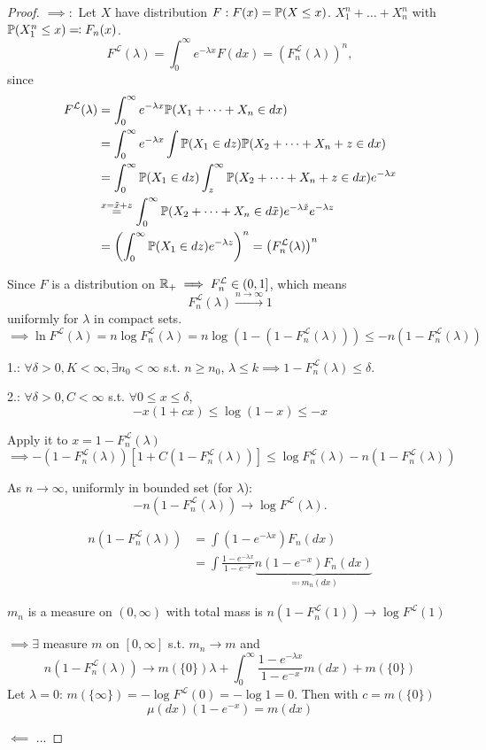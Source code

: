\begin{proof}
    $\implies:$ Let $X$ have distribution $F:F(x)=\mathbb{P}(X\leq x)$. $X_1^n+\dots+X_n^n$ with $\mathbb{P}(X_1^n\leq x)\eqqcolon F_n(x)$.   
    \[F^{\mathcal{L}}(\lambda)=\int_0^\infty e^{-\lambda x}F(dx)=(F_n^{\mathcal{L}}(\lambda))^n,\]
    since 
    \begin{align*}
        F^{\mathcal{L}}(\lambda)&=\int_0^\infty e^{-\lambda x}\mathbb{P}(X_1+\dots+X_n\in dx)\\
        &=\int_0^\infty e^{-\lambda x}\int \mathbb{P}(X_1\in dz)\mathbb{P}(X_2+\dots+X_n+z\in dx)\\
        &=\int_0^\infty \mathbb{P}(X_1\in dz)\int_z^\infty \mathbb{P}(X_2+\dots+X_n+z\in dx)e^{-\lambda x}\\
        &\stackrel{x=\tilde{x}+z}{=}\int_0^\infty \mathbb{P}(X_2+\dots+X_n\in d\tilde{x})e^{-\lambda \tilde{x}}e^{-\lambda z}\\
        &=\left(\int_0^\infty \mathbb{P}(X_1\in dz)e^{-\lambda z}\right)^n = \left(F_n^{\mathcal{L}}(\lambda)\right)^n
    \end{align*}

    Since $F$ is a distribution on $\mathbb{R}_+\implies F_n^{\mathcal{L}}\in (0,1]$, which means 
    \[F_n^{\mathcal{L}}(\lambda)\stackrel{n\to\infty}{\to}1\]
    uniformly for $\lambda$ in compact sets. 
    \[\implies \ln F^{\mathcal{L}}(\lambda)=n\log F_n^{\mathcal{L}}(\lambda)=n\log (1-(1-F_n^{\mathcal{L}}(\lambda)))\leq -n (1-F_n^{\mathcal{L}}(\lambda))\]

    1.: $\forall \delta>0,K<\infty,\exists n_0<\infty$ s.t. $n\geq n_0$, $\lambda \leq k\implies 1-F_n^{\mathcal{L}}(\lambda)\leq \delta$.

    2.: $\forall \delta>0, C<\infty$ s.t. $\forall 0\leq x\leq \delta$,
    \[-x(1+cx)\leq \log(1-x)\leq -x\]

    Apply it to $x=1-F_n^{\mathcal{L}}(\lambda)$
    \[\implies -(1-F_n^{\mathcal{L}}(\lambda))[1+C(1-F_n^{\mathcal{L}}(\lambda))]\leq \log F_n^{\mathcal{L}}(\lambda)-n(1-F_n^{\mathcal{L}}(\lambda))\]

    As $n\to\infty$, uniformly in bounded set (for $\lambda$):
    \[-n(1-F_n^{\mathcal{L}}(\lambda))\to\log F^{\mathcal{L}}(\lambda).\]

    \begin{align*}
        n(1-F_n^{\mathcal{L}}(\lambda))&=\int(1-e^{-\lambda x}) F_n(dx)\\
        &= \int\frac{1-e^{-\lambda x}}{1-e^{-x}} \underbrace{n(1-e^{-x}) F_n(dx)}_{\eqcolon m_n(dx)}
    \end{align*}

    $m_n$ is a measure on $(0,\infty)$ with total mass is $n(1-F_n^{\mathcal{L}}(1))\to\log F^{\mathcal{L}}(1)$

    $\implies\exists$ measure $m$ on $[0,\infty]$ s.t. $m_n\to m$ and 
    \[n(1-F_n^{\mathcal{L}}(\lambda))\to m(\{0\})\lambda+\int_0^\infty \frac{1-e^{-\lambda x}}{1-e^{-x}}m(dx)+m(\{0\})\]
    Let $\lambda=0$: $m(\{\infty\})=-\log F^{\mathcal{L}}(0)=-\log 1=0$. Then with $c=m(\{0\})$
    \[\mu(dx)(1-e^{-x})=m(dx)\]

    $\impliedby$ ... 
\end{proof}


